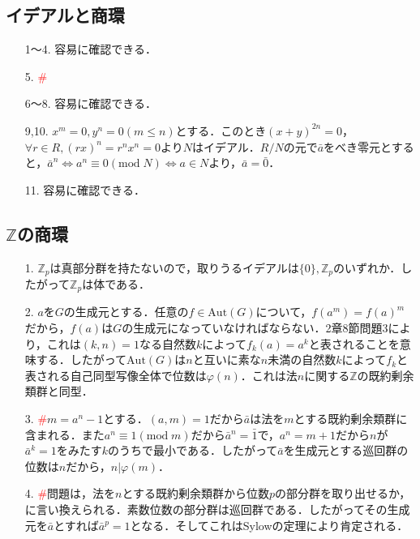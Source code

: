 \documentclass[a4paper,10pt,uplatex]{jsarticle}
\newcommand{\miss}{\textcolor{red}{\#}}
\newcommand{\Z}{\mathbb{Z}}
\newcommand{\Mod}{\text{mod}\;}
\newcommand{\Aut}{\text{Aut}}
\numberwithin{equation}{section}
\theoremstyle{mystyle}
\begin{document}
\subsection{イデアルと商環}
\begin{itemize}
    \item[1〜4.] 容易に確認できる．
    \item[5.] \miss
    \item[6〜8.] 容易に確認できる．
    \item[9,10.] $x^m = 0,y^n = 0(m \leq n)$とする．このとき$(x + y)^{2n} = 0$，$\forall r \in R, (rx)^n = r^nx^n = 0$より$N$はイデアル．$R/N$の元で$\bar{a}$をべき零元とすると，$\bar{a}^n \Leftrightarrow a^n \equiv 0(\Mod N) \Leftrightarrow a \in N$より，$\bar{a} = \bar{0}$．
    \item[11.] 容易に確認できる．
\end{itemize}

\subsection{$\Z$の商環}
\begin{itemize}
    \item[1.] $\Z_p$は真部分群を持たないので，取りうるイデアルは$\{0\},\Z_p$のいずれか．したがって$\Z_p$は体である．
    \item[2.] $a$を$G$の生成元とする．任意の$f \in \Aut(G)$について，$f(a^m) = f(a)^m$だから，$f(a)$は$G$の生成元になっていなければならない．2章8節問題3により，これは$(k,n)=1$なる自然数$k$によって$f_k(a)=a^k$と表されることを意味する．したがって$\Aut(G)$は$n$と互いに素な$n$未満の自然数$k$によって$f_k$と表される自己同型写像全体で位数は$\varphi(n)$．これは法$n$に関する$\Z$の既約剰余類群と同型．
    \item[3.] \miss $m = a^n-1$とする．$(a,m) = 1$だから$\bar{a}$は法を$m$とする既約剰余類群に含まれる．また$a^n \equiv 1(\Mod m)$だから$\bar{a}^n = \bar{1}$で，$a^n = m+1$だから$n$が$\bar{a}^k = 1$をみたす$k$のうちで最小である．したがって$\bar{a}$を生成元とする巡回群の位数は$n$だから，$n|\varphi(m)$．
    \item[4.] \miss 問題は，法を$n$とする既約剰余類群から位数$p$の部分群を取り出せるか，に言い換えられる．素数位数の部分群は巡回群である．したがってその生成元を$\bar{a}$とすれば$\bar{a}^p = 1$となる．そしてこれはSylowの定理により肯定される．
\end{itemize}
\end{document}
